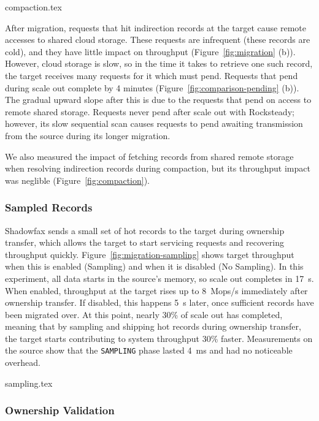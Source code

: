  {compaction.tex}

After migration, requests that hit indirection records at the
target cause remote accesses to shared cloud storage.
%
These requests are infrequent (these records are
cold), and they have little impact on throughput
(Figure~\ref{fig:migration} (b)).
%
However, cloud storage is slow, so in the time it takes to retrieve one such
record, the target receives many requests for it which must pend.
%
Requests that pend during scale out complete by 4 minutes
(Figure~\ref{fig:comparison-pending} (b)).
%
The gradual upward slope after this is due to the requests that
pend on access to remote shared storage.
%
Requests never pend after scale out with Rocksteady; however, its slow
sequential scan causes requests to pend awaiting transmission from the source
during its longer migration.

We also measured the impact of fetching records from shared remote storage when
resolving indirection records during compaction, but its throughput impact was
neglible (Figure~\ref{fig:compaction}).

\subsubsection{Sampled Records}
\label{sec:eval:sampling}

Shadowfax sends a small set of hot records to the target during ownership
transfer, which allows the target to start servicing requests and recovering
throughput quickly.
%
Figure~\ref{fig:migration-sampling} shows target throughput
when this is enabled (Sampling) and when it is disabled (No
Sampling).
%
In this experiment, all data starts in the source's memory, so scale out
completes in 17~s.
%
When enabled, throughput at the target rises up to 8~Mops/s immediately
after ownership transfer.
%
If disabled, this happens 5~s later, once sufficient records have
been migrated over.
%
At this point, nearly 30\% of scale out has completed, meaning that
by sampling and shipping hot records during ownership transfer,
the target starts contributing to system throughput 30\% faster.
%
Measurements on the source show that the \texttt{SAMPLING} phase lasted
4~ms and had no noticeable overhead.

 {sampling.tex}

\subsubsection{Ownership Validation}
\label{sec:eval:migration:views}

